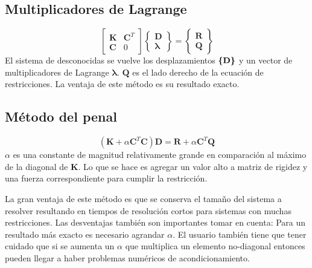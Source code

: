 \subsection*{Multiplicadores de Lagrange}

\begin{equation}
	\begin{bmatrix}
	\mathbf{K} & \mathbf{C}^T\\
	\mathbf{C} & 0
	\end{bmatrix}
	\begin{Bmatrix}
	\mathbf{D} \\
	\pmb{\lambda}
	\end{Bmatrix}
	=
	\begin{Bmatrix}
	\mathbf{R} \\
	\mathbf{Q}
	\end{Bmatrix}
\end{equation}
El sistema de desconocidas se vuelve los desplazamientos $\boldsymbol{\{ }\mathbf{D} \boldsymbol{\}}$ y un vector de multiplicadores de Lagrange $\pmb{\lambda} $. $\mathbf{Q}$ es el lado derecho de la ecuación de restricciones. La ventaja de este método es su resultado exacto.

\subsection*{Método del penal}
\begin{equation}
	(\mathbf{K}+\alpha \mathbf{C}^T \mathbf{C})\mathbf{D} = \mathbf{R} + \alpha \mathbf{C}^T \mathbf{Q}
\end{equation}
$\alpha$ es una constante de magnitud relativamente grande en comparación al máximo de la diagonal de $\mathbf{K}$. Lo que se hace es agregar un valor alto a matriz de rigidez y una fuerza correspondiente para cumplir la restricción. 

La gran ventaja de este método es que se conserva el tamaño del sistema a resolver resultando en tiempos de resolución cortos para sistemas con muchas restricciones. Las desventajas también son importantes tomar en cuenta: Para un resultado más exacto es necesario agrandar $\alpha$. El usuario también tiene que tener cuidado que si se aumenta un $\alpha$ que multiplica un elemento no-diagonal entonces pueden llegar a haber problemas numéricos de acondicionamiento. 

